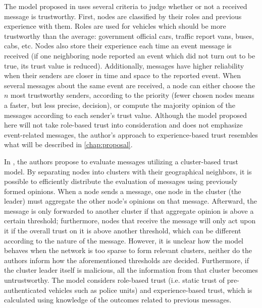 The model proposed in \cite{minhas2010towards} uses several criteria to judge whether or not a received message is trustworthy.
First, nodes are classified by their roles and previous experience with them.
Roles are used for vehicles which should be more trustworthy than the average: government official cars, traffic report vans, buses, cabs, etc.
Nodes also store their experience each time an event message is received (if one neighboring node reported an event which did not turn out to be true, its trust value is reduced).
Additionally, messages have higher reliability when their senders are closer in time and space to the reported event.
When several messages about the same event are received, a node can either choose the $n$ most trustworthy senders, according to the priority (fewer chosen nodes means a faster, but less precise, decision), or compute the majority opinion of the messages according to each sender's trust value.
Although the model proposed here will not take role-based trust into consideration and does not emphasize event-related messages, the author's approach to experience-based trust resembles what will be described in \autoref{chap:proposal}.

In \cite{chen2010trust}, the authors propose to evaluate messages utilizing a cluster-based trust model.
By separating nodes into clusters with their geographical neighbors, it is possible to efficiently distribute the evaluation of messages using previously formed opinions.
When a node sends a message, one node in the cluster (the leader) must aggregate the other node's opinions on that message.
Afterward, the message is only forwarded to another cluster if that aggregate opinion is above a certain threshold; furthermore, nodes that receive the message will only act upon it if the overall trust on it is above another threshold, which can be different according to the nature of the message.
However, it is unclear how the model behaves when the network is too sparse to form relevant clusters, neither do the authors inform how the aforementioned thresholds are decided.
Furthermore, if the cluster leader itself is malicious, all the information from that cluster becomes untrustworthy. 
The model considers role-based trust (i.e. static trust of pre-authenticated vehicles such as police units) and experience-based trust, which is calculated using knowledge of the outcomes related to previous messages.

